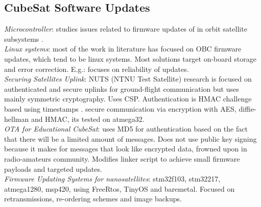 \iffalse

\subsection{CubeSat Software Updates}
\label{sec:fu-cubesat}
\textit{Microcontroller}: studies issues related to firmware updates of in orbit
satellite subsystems \cite{sunter2016updatesnano}.\\
\textit{Linux systems}: most of the work in literature has focused on OBC firmware
updates, which tend to be linux systems. Most solutions target on-board storage
and error correction. E.g.: \cite{FitzsimmonsReliableSoftwareUpdates} focuses on
reliability of updates.\\
\textit{Securing Satellites Uplink}: NUTS (NTNU Test Satellite)\cite{birkeland2014nutsoverview}
research is focused on authenticated and secure uplinks for ground-flight communication but
uses mainly symmetric cryptography. Uses CSP. Authentication is HMAC challenge
\cite{Muench2014IntegrationAV} based using timestamps \cite{bezem2013nutsAuthenticatedUplink}.
\cite{yasir2021EncryptioUnitSat} secure communication via encryption with AES, diffie-hellman
and HMAC, its tested on atmega32.\\
\textit{OTA for Educational CubeSat}\cite{maison2021otaeducubesat}: uses MD5 for
authentication based on the fact that there will be a limited amount of messages.
Does not use public key signing because it makes for messages that look like encrypted
data, frowned upon in radio-amateurs community. Modifies linker script to achieve
small firmware payloads and targeted updates.\\
\textit{Firmware Updating Systems for nanosatellites}\cite{sunter2016updatesnano}:
stm32f103, stm32217, atmega1280, msp420, using FreeRtos, TinyOS and baremetal. Focused
on retransmissions, re-ordering schemes and image backups.\\

